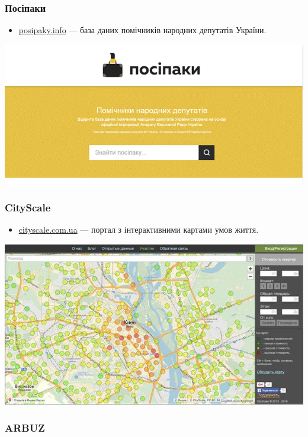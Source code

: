 \subsubsection{Посіпаки}

\begin{itemize}
    \item \href{http://posipaky.info/}{posipaky.info} — база даних помічників народних депутатів України.
\end{itemize}

\includegraphics{images/025.gif}

\subsubsection{CityScale}

\begin{itemize}
    \item \href{http://www.cityscale.com.ua/}{cityscale.com.ua} — портал з інтерактивними картами умов життя.
\end{itemize}

\includegraphics{images/026.jpg}

\subsubsection{ARBUZ}

